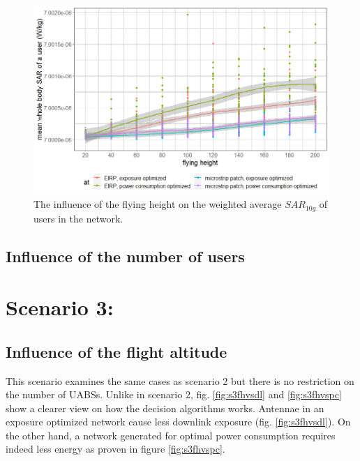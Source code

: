 \begin{figure}[h!]
  \includegraphics[width=\textwidth]{../results/s2/fhvssar.png}
  \caption{The influence of the flying height on the weighted average $SAR_{10g}$ of users in the network.}
  \label{fig:s2fhvssar}
\end{figure}


\subsection{Influence of the number of users}


\newpage
\section{Scenario 3:}
\subsection{Influence of the flight altitude}

This scenario examines the same cases as scenario 2 but there is no restriction on the number of \gls{UABS}s. 
Unlike in scenario 2, fig. \ref{fig:s3fhvsdl} and \ref{fig:s3fhvspc} show a clearer view on how the decision algorithms
works. Antennae in an exposure optimized network cause less downlink exposure (fig. \ref{fig:s3fhvsdl}). On the other hand, 
a network generated for optimal power consumption requires indeed less energy as proven in figure \ref{fig:s3fhvspc}. 

